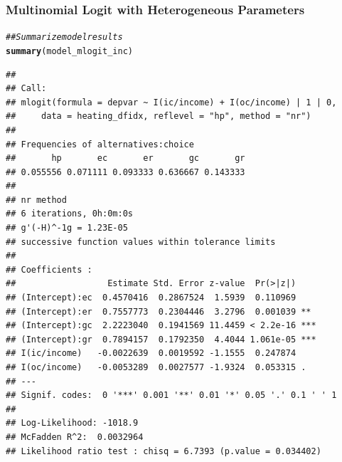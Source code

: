 \documentclass{beamer}\usepackage[]{graphicx}\usepackage[]{color}
\makeatletter
\newcommand{\hlcom}[1]{\textcolor[rgb]{0.678,0.584,0.686}{\textit{#1}}}%
\newcommand{\hlstd}[1]{\textcolor[rgb]{0.345,0.345,0.345}{#1}}%
\newcommand{\hlkwd}[1]{\textcolor[rgb]{0.737,0.353,0.396}{\textbf{#1}}}%
\newenvironment{kframe}{%
 \def\at@end@of@kframe{}%
 \ifinner\ifhmode%
  \def\at@end@of@kframe{\end{minipage}}%
  \begin{minipage}{\columnwidth}%
 \fi\fi%
 \def\FrameCommand##1{\hskip\@totalleftmargin \hskip-\fboxsep
 \colorbox{shadecolor}{##1}\hskip-\fboxsep
     \hskip-\linewidth \hskip-\@totalleftmargin \hskip\columnwidth}%
 \MakeFramed {\advance\hsize-\width
   \@totalleftmargin\z@ \linewidth\hsize
   \@setminipage}}%
 {\par\unskip\endMakeFramed%
 \at@end@of@kframe}
\newenvironment{knitrout}{}{} %
\makeatother
\begin{document}
\begin{frame}[fragile]\frametitle{Multinomial Logit with Heterogeneous Parameters}
\begin{knitrout}\tiny
{}\color{fgcolor}\begin{kframe}
\begin{alltt}
\hlcom{## Summarize model results}
\hlkwd{summary}\hlstd{(model_mlogit_inc)}
\end{alltt}
\begin{verbatim}
## 
## Call:
## mlogit(formula = depvar ~ I(ic/income) + I(oc/income) | 1 | 0, 
##     data = heating_dfidx, reflevel = "hp", method = "nr")
## 
## Frequencies of alternatives:choice
##       hp       ec       er       gc       gr 
## 0.055556 0.071111 0.093333 0.636667 0.143333 
## 
## nr method
## 6 iterations, 0h:0m:0s 
## g'(-H)^-1g = 1.23E-05 
## successive function values within tolerance limits 
## 
## Coefficients :
##                  Estimate Std. Error z-value  Pr(>|z|)    
## (Intercept):ec  0.4570416  0.2867524  1.5939  0.110969    
## (Intercept):er  0.7557773  0.2304446  3.2796  0.001039 ** 
## (Intercept):gc  2.2223040  0.1941569 11.4459 < 2.2e-16 ***
## (Intercept):gr  0.7894157  0.1792350  4.4044 1.061e-05 ***
## I(ic/income)   -0.0022639  0.0019592 -1.1555  0.247874    
## I(oc/income)   -0.0053289  0.0027577 -1.9324  0.053315 .  
## ---
## Signif. codes:  0 '***' 0.001 '**' 0.01 '*' 0.05 '.' 0.1 ' ' 1
## 
## Log-Likelihood: -1018.9
## McFadden R^2:  0.0032964 
## Likelihood ratio test : chisq = 6.7393 (p.value = 0.034402)
\end{verbatim}
\end{kframe}
\end{knitrout}
\end{frame}
\end{document}
